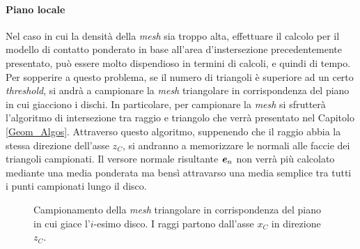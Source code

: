 \paragraph{Piano locale}
Nel caso in cui la densità della \textit{mesh} sia troppo alta, effettuare il calcolo per il modello di contatto ponderato in base all'area d'instersezione precedentemente presentato, può essere molto dispendioso in termini di calcoli, e quindi di tempo. Per sopperire a questo problema, se il numero di triangoli è superiore ad un certo \textit{threshold}, si andrà a campionare la \textit{mesh} triangolare in corrispondenza del piano in cui giacciono i dischi. In particolare, per campionare la \textit{mesh} si sfrutterà l'algoritmo di intersezione tra raggio e triangolo che verrà presentato nel Capitolo \ref{Geom_Algos}. Attraverso questo algoritmo, suppenendo che il raggio abbia la stessa direzione dell'asse $z_C$, si andranno a memorizzare le normali alle faccie dei triangoli campionati. Il versore normale risultante $\textbf{\textit{e}}_n$ non verrà più calcolato mediante una media ponderata ma bensì attravarso una media semplice tra tutti i punti campionati lungo il disco.

\begin{figure}
	\centering
	\caption{Campionamento della \textit{mesh} triangolare in corrispondenza del piano in cui giace l'$i$-esimo disco. I raggi partono dall'asse $x_C$ in direzione $z_C$.}
\end{figure}

